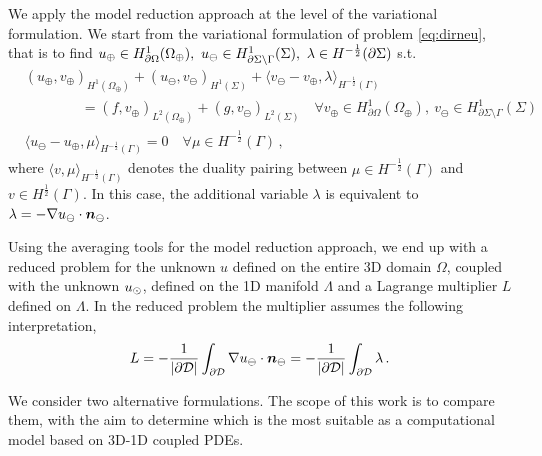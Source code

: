\documentclass[r]{siamart171218}
\begin{document}
We apply the model reduction approach at the level of the variational formulation.
We start from the variational formulation of problem \eqref{eq:dirneu}, 
that is to find $u_{\oplus} \in H^1_{\partial\Omega}(\Omega_\oplus), \ u_{\ominus} \in H^1_{\partial\Sigma\setminus\Gamma}(\Sigma), \ \lambda \in H^{-\frac12}(\partial\Sigma)$ s.t.
\begin{subequations}\label{eq:weak_dirneu}
\begin{align}
&(u_\oplus,v_\oplus)_{H^1(\Omega_\oplus)} + (u_\ominus,v_\ominus)_{H^1(\Sigma)} 
+ \langle v_\ominus - v_\oplus, \lambda \rangle_{H^{-\frac12}(\Gamma)} 
\\
\nonumber
&\qquad\qquad = (f,v_\oplus)_{L^2(\Omega_\oplus)} + (g,v_\ominus)_{L^2(\Sigma)}
\quad \forall v_\oplus \in H^1_{\partial\Omega}(\Omega_\oplus), \ v_\ominus \in H^1_{\partial\Sigma\setminus\Gamma}(\Sigma)
\\
& \langle u_\ominus - u_\oplus, \mu \rangle_{H^{-\frac12}(\Gamma)} = 0
\quad \forall  \mu \in H^{-\frac12}(\Gamma)\,,
\end{align}
\end{subequations}
where $\langle v, \mu \rangle_{H^{-\frac12}(\Gamma)}$ denotes the duality pairing between 
$ \mu \in H^{-\frac12}(\Gamma)$ and $v \in H^{\frac12}(\Gamma)$.
In this case, the additional variable $\lambda$ is equivalent to $\lambda  = - \nabla u_{\ominus} \cdot \boldsymbol n_\ominus$.

Using the averaging tools for the model reduction approach, we end up with a reduced problem
for the unknown $u$ defined on the entire 3D domain $\Omega$, coupled with the unknown $u_{\odot}$, defined on the 1D manifold $\Lambda$
and a Lagrange multiplier $L$ defined on $\Lambda$. In the reduced problem the multiplier assumes the following interpretation,
\begin{equation*}
L = - \frac{1}{|\partial{\cal D}|} \int_{\partial{\cal D}} \nabla \uf \cdot \nn_\ominus
   = - \frac{1}{|\partial{\cal D}|} \int_{\partial{\cal D}} \lambda \,.
\end{equation*}

We consider two alternative formulations. The scope of this work is to compare them, 
with the aim to determine which is the most suitable as a computational model based on 3D-1D coupled PDEs.

\end{document}

